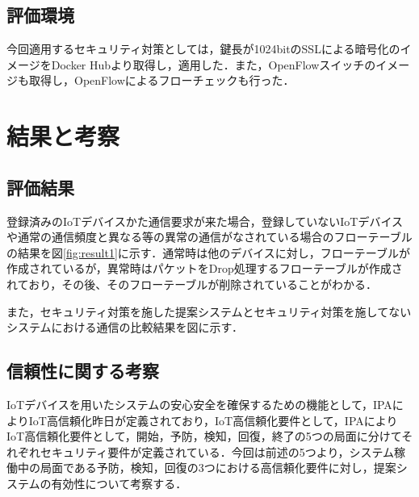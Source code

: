 \documentclass[Japanese]{dicomopapers}
\begin{document}
\subsection{評価環境}
今回適用するセキュリティ対策としては，鍵長が1024bitのSSLによる暗号化のイメージをDocker Hubより取得し，適用した．また，OpenFlowスイッチのイメージも取得し，OpenFlowによるフローチェックも行った．

\section{結果と考察}



\subsection{評価結果}
登録済みのIoTデバイスかた通信要求が来た場合，登録していないIoTデバイスや通常の通信頻度と異なる等の異常の通信がなされている場合のフローテーブルの結果を図\ref{fig:result1}に示す．通常時は他のデバイスに対し，フローテーブルが作成されているが，異常時はパケットをDrop処理するフローテーブルが作成されており，その後、そのフローテーブルが削除されていることがわかる．\par
また，セキュリティ対策を施した提案システムとセキュリティ対策を施してないシステムにおける通信の比較結果を図に示す．

\subsection{信頼性に関する考察}
IoTデバイスを用いたシステムの安心安全を確保するための機能として，IPAによりIoT高信頼化昨日が定義されており，IoT高信頼化要件として，IPAによりIoT高信頼化要件として，開始，予防，検知，回復，終了の5つの局面に分けてそれぞれセキュリティ要件が定義されている\cite{IPA}．今回は前述の5つより，システム稼働中の局面である予防，検知，回復の3つにおける高信頼化要件に対し，提案システムの有効性について考察する．
\end{document}
